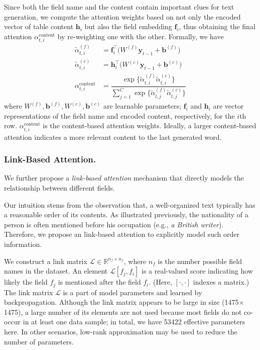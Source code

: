 \documentclass[letterpaper]{article} %
\begin{document}
Since both the field name and the content contain important clues for text generation, we compute the attention weights based on not only the encoded vector of table content  $\bm h_{i}$ but also the field embedding $\bm f_i$, thus obtaining the final attention $\alpha_{t,i}^\text{content}$ by re-weighting one with the other. Formally, we have
\begin{align}\label{eqn:content1}
\widetilde{\alpha}_{t,i}^{(f)} &= \bm f_i^\top\big(W^{(f)}\bm y_{t-1}+\bm b^{(f)}\big)\\\label{eqn:content2}
\widetilde{\alpha}_{t,i}^{(c)} &=\bm h_i^\top\big(W^{(c)}\bm y_{t-1}+\bm b^{(c)}\big)\\\label{eqn:content}
\alpha_{t,i}^\text{content}&=\dfrac{\exp\big\{\widetilde{\alpha}_{t,i}^{(f)}\widetilde{\alpha}_{t,i}^{(c)}\big\}}
{\sum_{j=1}^C\exp\big\{\widetilde{\alpha}_{t,j}^{(f)}\widetilde{\alpha}_{t,j}^{(c)}\big\}}
\end{align}
where $W^{(f)}, \bm b^{(f)}, W^{(c)}, \bm b^{(c)}$ are learnable parameters; $\bm f_i$ and $\bm h_i$ are vector representations of the field name and encoded content, respectively, for the $i$th row. $\alpha_{t,i}^\text{content}$ is the content-based attention weights. Ideally, a larger content-based attention indicates a more relevant content to the last generated word.





\subsubsection{Link-Based Attention.}
We further propose a \textit{link-based attention} mechanism that directly models the relationship between different fields.

Our intuition stems from the observation that, a well-organized text typically has a reasonable order of its contents. As illustrated previously, the nationality of a person is often mentioned before his occupation (e.g., \textit{a British writer}). Therefore, we propose an link-based attention to explicitly model such order information.

We construct a link matrix $\mathscr{L}\in\mathbb{R}^{n_{\!f}\times n_{\!f}}$, where $n_{f}$ is the number possible field names in the dataset. An element $\mathscr{L}[f_{\!j},f_{\!i}]$ is a real-valued score indicating how likely the field $f_j$ is mentioned after the field $f_i$.  (Here, $[\cdot, \cdot]$ indexes a matrix.) The link matrix $\mathscr{L}$ is a part of model parameters and learned by backpropagation. Although the link matrix appears to be large in size (1475$\times$1475), a large number of its elements are not used because most fields do not co-occur in at least one data sample; in total, we have 53422 effective parameters here. In other scenarios, low-rank approximation may be used to reduce the number of parameters.
\end{document}
